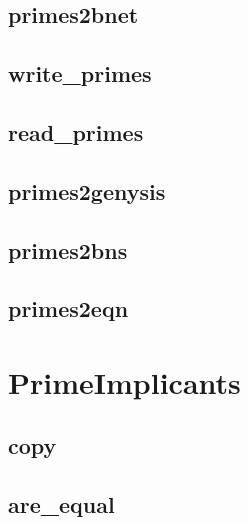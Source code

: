 \documentclass[letterpaper,10pt,english]{sphinxmanual}
\begin{document}
\subsection{primes2bnet}
\label{\detokenize{FileExchange:primes2bnet}}\label{\detokenize{FileExchange:id3}}

\subsection{write\_primes}
\label{\detokenize{FileExchange:write-primes}}\label{\detokenize{FileExchange:id4}}

\subsection{read\_primes}
\label{\detokenize{FileExchange:id5}}\label{\detokenize{FileExchange:read-primes}}

\subsection{primes2genysis}
\label{\detokenize{FileExchange:id6}}\label{\detokenize{FileExchange:primes2genysis}}

\subsection{primes2bns}
\label{\detokenize{FileExchange:id7}}\label{\detokenize{FileExchange:primes2bns}}

\subsection{primes2eqn}
\label{\detokenize{FileExchange:primes2eqn}}\label{\detokenize{FileExchange:id8}}

\section{PrimeImplicants}
\label{\detokenize{PrimeImplicants:networkx-has-path}}\label{\detokenize{PrimeImplicants::doc}}\label{\detokenize{PrimeImplicants:primeimplicants}}\label{\detokenize{PrimeImplicants:id1}}

\subsection{copy}
\label{\detokenize{PrimeImplicants:copy}}\label{\detokenize{PrimeImplicants:primes-copy}}

\subsection{are\_equal}
\label{\detokenize{PrimeImplicants:id2}}\label{\detokenize{PrimeImplicants:are-equal}}
\end{document}
